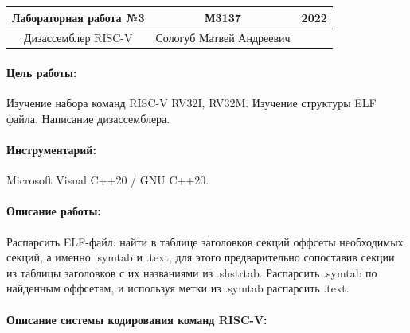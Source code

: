\documentclass{article}
\begin{document}
	\pagestyle{empty}
	\normalsize
	\newcommand{\R}{{\mathbb R}}
	\newcommand{\N}{{\mathbb N}}
	\newcommand{\lm}[2]{\displaystyle \lim_{#2 \to \infty}{#1_{#2}}}
	\newcommand{\eps}{\varepsilon}
	\begin{center}
\begin{tabular}{ |c|c|c| } 
	\hline
	Лабораторная работа №3 & М3137 & 2022 \\ 
	\hline
	Дизассемблер RISC-V & Сологуб Матвей Андреевич & \\ 
	\hline
\end{tabular}
\end{center}
	\large
\paragraph{Цель работы:}
Изучение набора команд RISC-V RV32I, RV32M. Изучение структуры ELF файла. Написание дизассемблера.
\paragraph{Инструментарий:}
Microsoft Visual C++20 / GNU C++20.
\paragraph{Описание работы:}
Распарсить ELF-файл: найти в таблице заголовков секций оффсеты необходимых секций, а именно .symtab и .text, для этого предварительно сопоставив секции из таблицы заголовков с их названиями из .shstrtab. Распарсить .symtab по найденным оффсетам, и используя метки из .symtab распарсить .text.
\paragraph{Описание системы кодирования команд RISC-V:}
\end{document}
